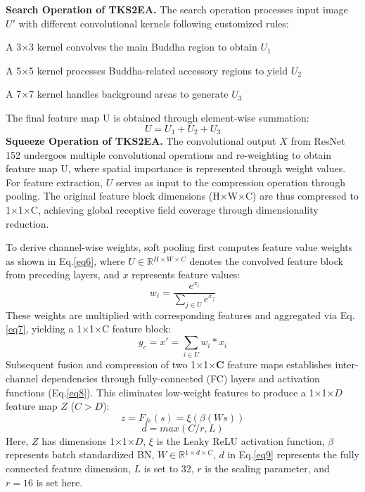 \documentclass[sn-mathphys]{sn-jnl}%
\theoremstyle{thmstyleone}%
\theoremstyle{thmstyletwo}%
\theoremstyle{thmstylethree}%
\begin{document}
\textbf{Search Operation of TKS2EA. }The search operation processes input image $ U' $ with different convolutional kernels following customized rules:  

A 3×3 kernel convolves the main Buddha region to obtain $ {U_1} $  

A 5×5 kernel processes Buddha-related accessory regions to yield $ {U_2} $  

A 7×7 kernel handles background areas to generate $ {U_3} $  

The final feature map U is obtained through element-wise summation:  
\begin{equation}
	U = {U_1} + {U_2} + {U_3}
	\label{eq5}
\end{equation}
\textbf{Squeeze Operation of TKS2EA. }The convolutional output $ X $ from ResNet 152 undergoes multiple convolutional operations and re-weighting to obtain feature map U, where spatial importance is represented through weight values. For feature extraction, $ U $ serves as input to the compression operation through pooling. The original feature block dimensions (H×W×C) are thus compressed to 1×1×C, achieving global receptive field coverage through dimensionality reduction.

To derive channel-wise weights, soft pooling first computes feature value weights as shown in Eq.\eqref{eq6}, where $ U \in\mathbb{R}{^{H \times W \times C}} $ denotes the convolved feature block from preceding layers, and $ x $ represents feature values:  
\begin{equation}
	{w_i}=\frac{{{e^{{x_i}}}}}{{\sum\limits_{j \in U} {{e^{{x_j}}}} }}
	\label{eq6}
\end{equation}
These weights are multiplied with corresponding features and aggregated via Eq.\eqref{eq7}, yielding a 1×1×C feature block: 
\begin{equation}
	{y_c}=x'=\sum\limits_{i \in U} {{w_i}*{x_i}}
	\label{eq7}
\end{equation}
Subsequent fusion and compression of two 1×1×\textbf{C} feature maps establishes inter-channel dependencies through fully-connected (FC) layers and activation functions (Eq.\eqref{eq8}). This eliminates low-weight features to produce a 1×1×$ D $  feature map $ Z $ ($ C>D $):  
\begin{equation}
	z={F_{fc}}(s)=\xi (\beta (Ws))
	\label{eq8}
\end{equation}
\begin{equation}
	d=max(C/r,L)
	\label{eq9}
\end{equation}
Here, $ Z $ has dimensions 1×1×$ D $, $ \xi $ is the Leaky ReLU activation function, $ \beta $ represents batch standardized BN, $ W \in\mathbb{R}{^{1 \times d \times C}} $, $ d $ in Eq.\eqref{eq9} represents the fully connected feature dimension, $ L $ is set to 32, $ r $ is the scaling parameter, and $ r=16 $ is set here.
\end{document}

